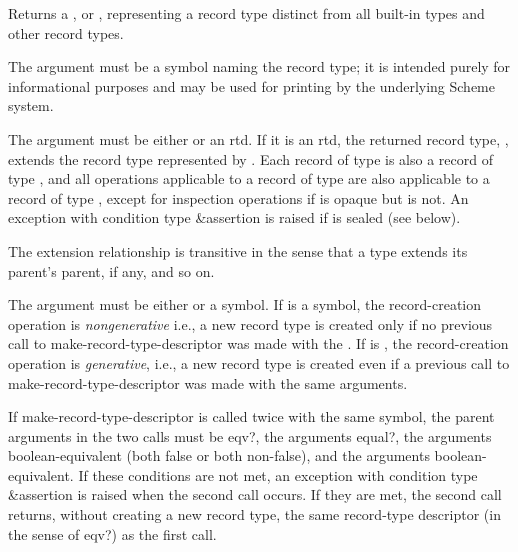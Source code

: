 \begin{entry}{%
}
   
Returns a , or ,
representing a record type distinct from all built-in types and
other record types.

The  argument must be a symbol naming the record type; it is
intended purely for informational purposes and may be used for printing by
the underlying Scheme system.

The  argument must be either \schfalse{} or an rtd. If it is an
rtd, the returned record type, , extends the record type
 represented by . Each record of type  is also a
record of type , and all operations applicable to a record of
type  are also applicable to a record of type , except for
inspection operations if  is opaque but  is not. An exception with
condition type {\cf\&assertion} is raised if  is sealed (see below).
   
The extension relationship is transitive in the sense that a type extends
its parent's parent, if any, and so on.
   
The  argument must be either \schfalse{} or a symbol.
If  is a symbol, the record-creation operation is
\emph{nongenerative} i.e., a new record type is created only
if no previous call to {\cf make-record-type-descriptor}
was made with the .
If  is \schfalse{}, the record-creation operation is
\emph{generative}, i.e., a new record type is created even if
a previous call to {\cf make-record-type-descriptor} was
made with the same arguments.

If {\cf make-record-type-descriptor} is
called twice with the same  symbol, the parent
arguments in the two calls must be {\cf eqv?}, the 
arguments {\cf equal?}, the  arguments boolean-equivalent
(both false or both non-false), and the  arguments
boolean-equivalent.
If these conditions are not met, an exception with condition type
{\cf\&assertion} is raised when the second call occurs.
If they are met, the second call returns, without creating a new
record type, the same record-type descriptor
(in the sense of {\cf eqv?}) as the first call.


\end{entry}
